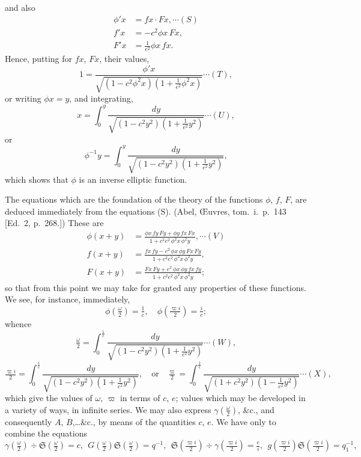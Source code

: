 \documentclass[12pt,a4paper]{article}
\newcommand{\fS}{\mathfrak{S}}
\begin{document}
\newpage
\setcounter{page}{147}

and also
\begin{align*}
\phi' x &= f x \cdot F x, \cdots(S)\\
f' x &= -c^2 \phi x\,F x,\\
F' x &= \tfrac{1}{e^2}\phi x\,f x.
\end{align*}
Hence, putting for $f x$, $F x$, their values,
\[
1 = \frac{\phi' x}{\sqrt{(1 - c^2 \phi^2 x)(1 + \tfrac{1}{e^2}\phi^2 x)}} \cdots(T),
\]
or writing $\phi x = y$, and integrating,
\[
x = \int_0^y \frac{dy}{\sqrt{(1 - c^2 y^2)(1 + \tfrac{1}{e^2} y^2)}} \cdots(U),
\]
or
\[
\phi^{-1} y = \int_0^y \frac{dy}{\sqrt{(1 - c^2 y^2)(1 + \tfrac{1}{e^2} y^2)}},
\]
which shows that $\phi$ is an inverse elliptic function.

The equations which are the foundation of the theory of the functions $\phi$, $f$, $F$, are deduced immediately from the equations (S). (Abel, \OE uvres, tom.~i.\ p.~143 [Ed.~2, p.~268.]) These are
\begin{align*}
\phi(x+y) &= \frac{\phi x\,f y\,F y + \phi y\,f x\,F x}{1 + c^2 e^2\,\phi^2 x\,\phi^2 y}, \cdots(V)\\
f(x+y) &= \frac{f x\,f y - c^2\,\phi x\,\phi y\,F x\,F y}{1 + c^2 e^2\,\phi^2 x\,\phi^2 y},\\
F(x+y) &= \frac{F x\,F y + e^2\,\phi x\,\phi y\,f x\,f y}{1 + c^2 e^2\,\phi^2 x\,\phi^2 y};
\end{align*}
so that from this point we may take for granted any properties of these functions. We see, for instance, immediately,
\[
\phi\!\left(\tfrac{\omega}{2}\right) = \tfrac{1}{c},\quad \phi\!\left(\tfrac{\varpi i}{2}\right) = \tfrac{i}{e};
\]
whence
\[
\tfrac{\omega}{2} = \int_0^{\frac{1}{c}}\!\frac{dy}{\sqrt{(1 - c^2 y^2)(1 + \tfrac{1}{e^2} y^2)}} \cdots(W),
\]
\[
\tfrac{\varpi i}{2} = \int_0^{\frac{i}{e}}\!\frac{dy}{\sqrt{(1 - c^2 y^2)(1 + \tfrac{1}{e^2} y^2)}},\quad \text{or}\quad \tfrac{\varpi}{2} = \int_0^{\frac{1}{e}}\!\frac{dy}{\sqrt{(1 + c^2 y^2)(1 - \tfrac{1}{e^2} y^2)}} \cdots(X),
\]
which give the values of $\omega$, $\varpi$ in terms of $c$, $e$; values which may be developed in a variety of ways, in infinite series. We may also express $\gamma\!\left(\tfrac{\omega}{2}\right)$, \&c., and consequently $A$, $B$,\ldots\&c., by means of the quantities $c$, $e$. We have only to combine the equations
\[
\gamma\!\left(\tfrac{\omega}{2}\right)\div\fS\!\left(\tfrac{\omega}{2}\right) = c,\ \ G\!\left(\tfrac{\omega}{2}\right)\fS\!\left(\tfrac{\omega}{2}\right) = q^{-1},\ \ \fS\!\left(\tfrac{\varpi i}{2}\right)\div\gamma\!\left(\tfrac{\varpi i}{2}\right) = \tfrac{e}{i},\ \ g\!\left(\tfrac{\varpi i}{2}\right)\fS\!\left(\tfrac{\varpi i}{2}\right) = q_1^{-1},
\]
\end{document}
